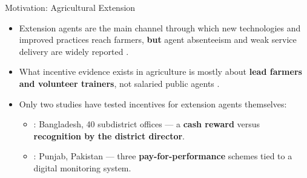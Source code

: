 \documentclass[aspectratio=169]{beamer}
\begin{document}
\begin{frame}{Motivation: Agricultural Extension}
	\begin{itemize}
		\item Extension agents are the main channel through which new technologies and
		improved practices reach farmers, \textbf{but} agent absenteeism and weak service
		delivery are widely reported \citep{anderson_chapter_2007, alam_incentives_2024}.
		\item What incentive evidence exists in agriculture is mostly about \textbf{lead farmers
		and volunteer trainers}, not salaried public agents \citep{balew_incentivizing_2023,
		benyishay_social_2019, shikuku_incentives_2019, okello_social_2023}.
		\item Only two studies have tested incentives for extension agents themselves:
		\begin{itemize}
			\item \citet{alam_incentives_2024}: Bangladesh, 40 subdistrict offices --- a
			\textbf{cash reward} versus \textbf{recognition by the district director}.
			\item \citet{genicot_carrots_nodate}: Punjab, Pakistan --- three
			\textbf{pay-for-performance} schemes tied to a digital monitoring system.
		\end{itemize}
	\end{itemize}
\end{frame}
\end{document}
